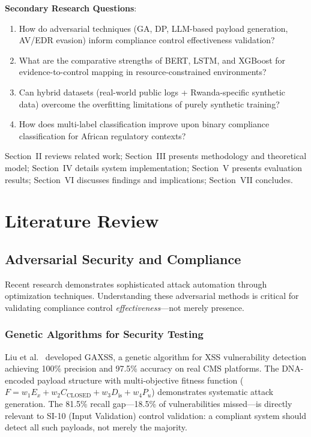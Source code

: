 \documentclass[11pt,conference]{IEEEtran}
\begin{document}
\textbf{Secondary Research Questions}:
\begin{enumerate}
    \item[\textbf{RQ1}] How do adversarial techniques (GA, DP, LLM-based payload generation, AV/EDR evasion) inform compliance control effectiveness validation?
    \item[\textbf{RQ2}] What are the comparative strengths of BERT, LSTM, and XGBoost for evidence-to-control mapping in resource-constrained environments?
    \item[\textbf{RQ3}] Can hybrid datasets (real-world public logs + Rwanda-specific synthetic data) overcome the overfitting limitations of purely synthetic training?
    \item[\textbf{RQ4}] How does multi-label classification improve upon binary compliance classification for African regulatory contexts?
\end{enumerate}

Section~II reviews related work; Section~III presents methodology and theoretical model; Section~IV details system implementation; Section~V presents evaluation results; Section~VI discusses findings and implications; Section~VII concludes.

\section{Literature Review}

\subsection{Adversarial Security and Compliance}

Recent research demonstrates sophisticated attack automation through optimization techniques. Understanding these adversarial methods is critical for validating compliance control \textit{effectiveness}---not merely presence.

\subsubsection{Genetic Algorithms for Security Testing}

Liu et al.\ \cite{ga_xss_paper} developed GAXSS, a genetic algorithm for XSS vulnerability detection achieving 100\% precision and 97.5\% accuracy on real CMS platforms. The DNA-encoded payload structure with multi-objective fitness function ($F = w_1 E_x + w_2 C_{\text{CLOSED}} + w_3 D_{\text{is}} + w_4 P_u$) demonstrates systematic attack generation. The 81.5\% recall gap---18.5\% of vulnerabilities missed---is directly relevant to SI-10 (Input Validation) control validation: a compliant system should detect all such payloads, not merely the majority.
\end{document}
